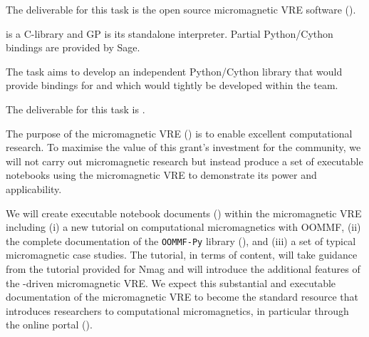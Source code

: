 \begin{workpackage}
\begin{tasklist}
\begin{task}[lead=USO,title=Case study: micromagnetic VRE built from
  \TheProject,id=oommf-py-ipython-attributes,PM=6,partners={SR,USH},wphases=9-15]
  The deliverable for this task is the open source micromagnetic VRE
  software ().
\end{task}

\begin{task}[lead=UB,title=Python/Cython bindings for Pari,PM=16,id=pari-python,wphases=0-24]
  \Pari is a C-library and GP is its standalone interpreter. Partial
  Python/Cython bindings are provided by Sage.

  The task aims to develop an independent Python/Cython library that would provide
  bindings for \PariGP and which would tightly be developed within the \PariGP team.

  The deliverable for this task is .
\end{task}

\begin{task}[lead=USO,title=Demonstrator: micromagnetic VRE notebooks,
  id=oommf-tutorial-and-documentation,PM=6,partners={SR,PS},wphases=15-21]

  The purpose of the micromagnetic VRE
  () is to enable excellent
  computational research. To maximise the value of this grant's investment for the
  community, we will not carry out micromagnetic research but instead
  produce a set of executable notebooks using the micromagnetic VRE
  to demonstrate its power and applicability.

  We will create executable notebook documents
  () within the micromagnetic VRE
  including (i) a new tutorial on computational micromagnetics with
  OOMMF, (ii) the complete documentation of the \texttt{OOMMF-Py}
  library (),
  and (iii) a set of typical micromagnetic case studies. The tutorial,
  in terms of content, will take guidance from the tutorial provided
  for Nmag \cite{Nmag-tutorial-url} and will introduce the additional
  features of the \Jupyter-driven micromagnetic VRE. We expect this
  substantial and executable documentation of the micromagnetic VRE to
  become the standard resource that introduces researchers to
  computational micromagnetics, in particular through the online
  portal ().


\end{task}
\end{tasklist}
\end{workpackage}
